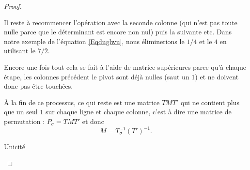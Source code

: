 \begin{proof}
\begin{subproof}
    Il reste à recommencer l'opération avec la seconde colonne (qui n'est pas toute nulle parce que le déterminant est encore non nul) puis la suivante etc. Dans notre exemple de l'équation \eqref{Eqduglwu}, nous éliminerions le \( 1/4\) et le \( 4\) en utilisant le \( 7/2\).

    Encore une fois tout cela se fait à l'aide de matrice supérieures parce qu'à chaque étape, les colonnes précédent le pivot sont déjà nulles (saut un \( 1\)) et ne doivent donc pas être touchées.

    À la fin de ce processus, ce qui reste est une matrice \( TMT'\) qui ne contient plus que un seul \( 1\) sur chaque ligne et chaque colonne, c'est à dire une matrice de permutation : \( P_{\sigma}=TMT'\) et donc
    \begin{equation}
        M=T^{-1}_{\sigma}(T')^{-1}.
    \end{equation}

        \item[Unicité]


\end{subproof}
\end{proof}
